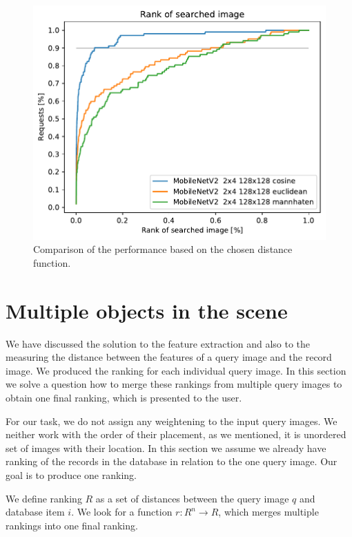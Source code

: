 \begin{figure}
    \centering
    \includegraphics{graphs/3aab502ea602a9f49afaa0a0d998cf226a0a67b9efcaa655d2ddf5063eeabe47.pdf}
    \caption{Comparison of the performance based on the chosen distance function.}
    \label{fig:regions_distances}
\end{figure}

\section{Multiple objects in the scene}

We have discussed the solution to the feature extraction and also to the measuring the distance between the features of a query image and the record image. We produced the ranking for each individual query image. In this section we solve a question how to merge these rankings from multiple query images to obtain one final ranking, which is presented to the user.

For our task, we do not assign any weightening to the input query images. We neither work with the order of their placement, as we mentioned, it is unordered set of images with their location. In this section we assume we already have ranking of the records in the database in relation to the one query image. Our goal is to produce one ranking.

We define ranking $R$ as a set of distances between the query image $q$ and database item $i$. We look for a function $r: R^n \rightarrow R$, which merges multiple rankings into one final ranking.

